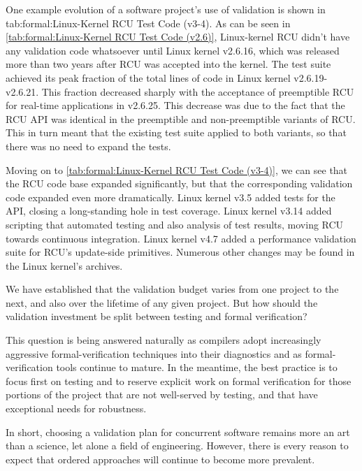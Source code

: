 One example evolution of a software project's use of validation is
shown in
{tab:formal:Linux-Kernel RCU Test Code (v3-4)}.
As can be seen in \cref{tab:formal:Linux-Kernel RCU Test Code (v2.6)},
Linux-kernel RCU didn't have any validation code whatsoever until Linux
kernel v2.6.16, which was released more than two years after RCU was
accepted into the kernel.
The test suite achieved its peak fraction of the total lines of code
in Linux kernel v2.6.19-v2.6.21.
This fraction decreased sharply with the acceptance of preemptible RCU
for real-time applications in v2.6.25.
This decrease was due to the fact that the RCU API was identical
in the preemptible and non-preemptible variants of RCU.
This in turn meant that the existing test suite applied to both variants,
so that there was no need to expand the tests.

Moving on to
\cref{tab:formal:Linux-Kernel RCU Test Code (v3-4)},
we can see that the RCU code base expanded significantly, but that the
corresponding validation code expanded even more dramatically.
Linux kernel v3.5 added tests for the  API, closing
a long-standing hole in test coverage.
Linux kernel v3.14 added scripting that automated testing and also
analysis of test results, moving RCU towards continuous integration.
Linux kernel v4.7 added a performance validation suite for RCU's update-side
primitives.
Numerous other changes may be found in the Linux kernel's  archives.

We have established that the validation budget varies from one project
to the next, and also over the lifetime of any given project.
But how should the validation investment be split between testing and
formal verification?

This question is being answered naturally as compilers adopt increasingly
aggressive formal-verification techniques into their diagnostics and
as formal-verification tools continue to mature.
In the meantime, the best practice is to focus first on testing and to
reserve explicit work on formal verification for those portions of the
project that are not well-served by testing, and that have exceptional
needs for robustness.

In short, choosing a validation plan for concurrent software remains
more an art than a science, let alone a field of engineering.
However, there is every reason to expect that ordered approaches
will continue to become more prevalent.
